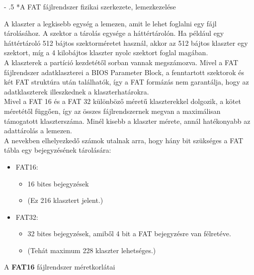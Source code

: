 \documentclass[tikz,12pt,margin=0px]{article}
\makeatletter
\renewcommand\paragraph{%
	\@startsection{paragraph}{4}{0mm}%
	{-\baselineskip}%
	{.5\baselineskip}%
	{\normalfont\normalsize\bfseries}}
\makeatother
\begin{document}
    \paragraph*{A FAT fájlrendszer fizikai szerkezete, lemezkezelése}

    \noindent A klaszter a legkisebb egység a lemezen, amit le lehet foglalni egy fájl tárolásához. A szektor a tárolás egysége a háttértárolón. Ha például egy háttértároló 512 bájtos szektorméretet használ, akkor az 512 bájtos klaszter egy szektort, míg a 4 kilobájtos klaszter nyolc szektort foglal magában.\\

    \noindent A klaszterek a partíció kezdetétől sorban vannak megszámozva. Mivel a FAT fájlrendszer adatklaszterei a BIOS Parameter Block, a fenntartott szektorok és két FAT struktúra után találhatók, így a FAT formázás nem garantálja, hogy az adatklaszterek illeszkednek a klaszterhatárokra.\\

    \noindent Mivel a FAT 16 és a FAT 32 különböző méretű klaszterekkel dolgozik, a kötet méretétől függően, így az összes fájlrendszernek megvan a maximálisan támogatott klaszterszáma. Minél kisebb a klaszter mérete, annál hatékonyabb az adattárolás a lemezen.\\

    \noindent A nevekben elhelyezkedő számok utalnak arra, hogy hány bit szükséges a FAT tábla egy bejegyzésének tárolására:
    \begin{itemize}[topsep=8pt,itemsep=4pt,partopsep=4pt, parsep=4pt]
        \item FAT16:
        \begin{itemize}
            \item 16 bites bejegyzések
            \item (Ez 216 klasztert jelent.)
        \end{itemize}
        \item FAT32:
        \begin{itemize}
            \item 32 bites bejegyzések, amiből 4 bit a FAT bejegyzésre van félretéve.
            \item (Tehát maximum 228 klaszter lehetséges.)\\
        \end{itemize}
    \end{itemize}

    \noindent A \textbf{FAT16} fájlrendszer méretkorlátai\\
\end{document}
